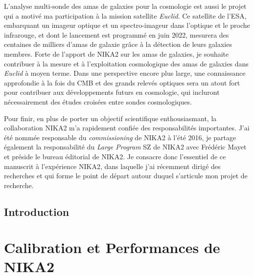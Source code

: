 \documentclass[a4paper, 12pt]{report}
\begin{document}
L'analyse multi-sonde des amas de galaxies pour la cosmologie est
aussi le projet qui a motivé ma participation à la mission satellite
\emph{Euclid}. Ce satellite de l'ESA, embarquant un imageur optique et un
spectro-imageur dans l'optique et le proche infrarouge, et dont le
lancement est programmé en juin 2022, mesurera des centaines de
milliers d'amas de galaxie grâce à la détection de leurs galaxies
membres. Forte de l'apport de NIKA2 sur les amas de galaxies, je
souhaite contribuer à la mesure et à l'exploitation cosmologique des
amas de galaxies dans \emph{Euclid} à moyen terme. Dans une perspective
encore plus large, une connaissance approfondie à la fois du CMB et
des grands relevés optiques sera un atout fort pour contribuer aux
développements futurs en cosmologie, qui incluront nécessairement des
études croisées entre sondes cosmologiques.     

Pour finir, en plus de porter un objectif scientifique enthousiasmant,
la collaboration NIKA2 m'a rapidement confiée des responsabilités
importantes. J'ai été nommée responsable du \emph{commissioning} de
NIKA2 à l'été 2016, je partage également la responsabilité du \emph{Large
Program} SZ de NIKA2 avec Frédéric Mayet et préside le bureau éditorial
de NIKA2. Je consacre donc l'essentiel de ce manuscrit à l'expérience
NIKA2, dans laquelle j'ai récemment dirigé des recherches et qui
forme le point de départ autour duquel s'articule mon projet de
recherche.






\chapter*{Introduction}




%
%
%
%
%
%
%
%

%
%
%
%
%
%
%

\part{Calibration et Performances de NIKA2}
%
%   
%
\end{document}
